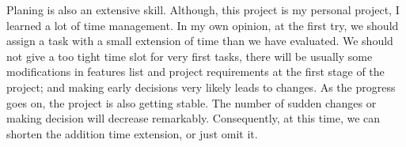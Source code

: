 Planing is also an extensive skill.
Although, this project is my personal project, I learned a lot of time management.
In my own opinion, at the first try, we should assign a task with a small extension of time than we have evaluated.
We should not give a too tight time slot for very first tasks, there will be usually some modifications in features list and project requirements at the first stage of the project; and making early decisions very likely leads to changes.
As the progress goes on, the project is also getting stable.
The number of sudden changes or making decision will decrease remarkably.
Consequently, at this time, we can shorten the addition time extension, or just omit it.

